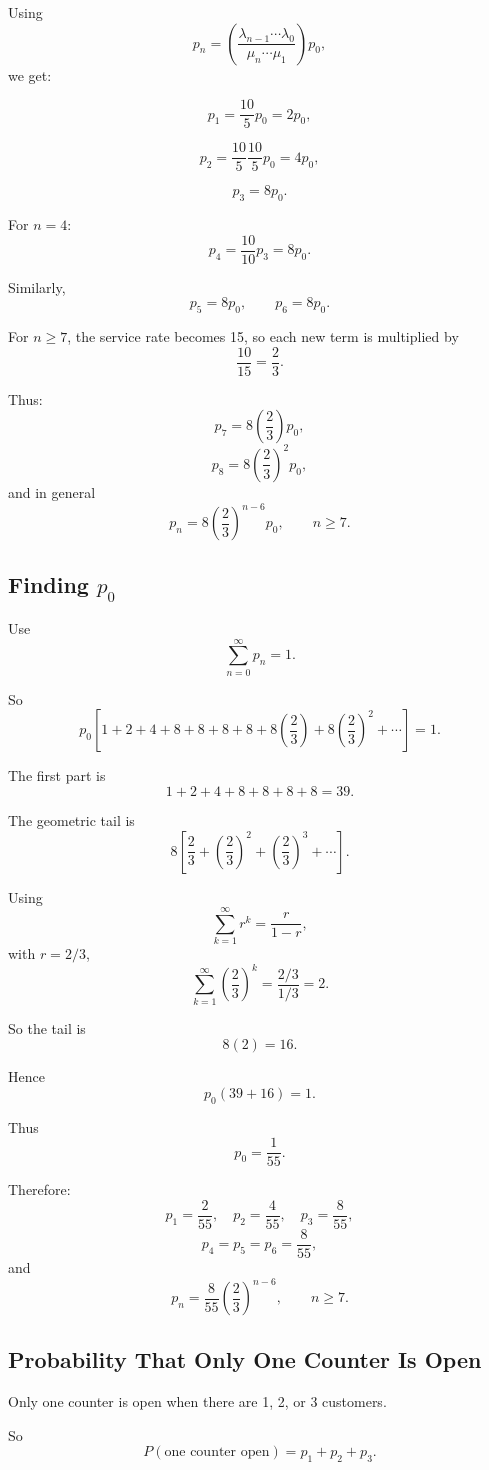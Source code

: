 \documentclass[12pt]{article}
\begin{document}
Using
\[
p_n
=
\left(
\frac{\lambda_{n-1}\cdots\lambda_0}
{\mu_n\cdots\mu_1}
\right)p_0,
\]
we get:

\[
p_1=\frac{10}{5}p_0=2p_0,
\]

\[
p_2=\frac{10}{5}\frac{10}{5}p_0=4p_0,
\]

\[
p_3=8p_0.
\]

For \(n=4\):
\[
p_4=\frac{10}{10}p_3=8p_0.
\]

Similarly,
\[
p_5=8p_0,\qquad p_6=8p_0.
\]

For \(n\geq 7\), the service rate becomes 15, so each new term is multiplied by
\[
\frac{10}{15}=\frac23.
\]

Thus:
\[
p_7=8\left(\frac23\right)p_0,
\]
\[
p_8=8\left(\frac23\right)^2p_0,
\]
and in general
\[
p_n=8\left(\frac23\right)^{n-6}p_0,\qquad n\geq 7.
\]

\subsection*{Finding \(p_0\)}

Use
\[
\sum_{n=0}^{\infty}p_n=1.
\]

So
\[
p_0\left[
1+2+4+8+8+8+8
+8\left(\frac23\right)
+8\left(\frac23\right)^2+\cdots
\right]=1.
\]

The first part is
\[
1+2+4+8+8+8+8=39.
\]

The geometric tail is
\[
8\left[
\frac23+\left(\frac23\right)^2+\left(\frac23\right)^3+\cdots
\right].
\]

Using
\[
\sum_{k=1}^{\infty}r^k=\frac{r}{1-r},
\]
with \(r=2/3\),
\[
\sum_{k=1}^{\infty}\left(\frac23\right)^k
=
\frac{2/3}{1/3}=2.
\]

So the tail is
\[
8(2)=16.
\]

Hence
\[
p_0(39+16)=1.
\]

Thus
\[
\boxed{p_0=\frac{1}{55}.}
\]

Therefore:
\[
p_1=\frac{2}{55},\quad
p_2=\frac{4}{55},\quad
p_3=\frac{8}{55},
\]
\[
p_4=p_5=p_6=\frac{8}{55},
\]
and
\[
p_n=\frac{8}{55}\left(\frac23\right)^{n-6},\qquad n\geq 7.
\]

\subsection*{Probability That Only One Counter Is Open}

Only one counter is open when there are 1, 2, or 3 customers.

So
\[
P(\text{one counter open})=p_1+p_2+p_3.
\]
\end{document}
